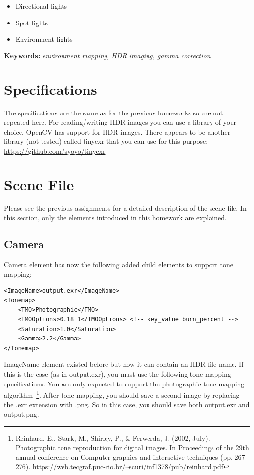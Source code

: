 \documentclass[12pt]{article}
\begin{document}
\begin{itemize}
    \item Directional lights
    \item Spot lights
    \item Environment lights
\end{itemize}

\vspace{0.5cm} \noindent \textbf{Keywords:} \emph{environment mapping, HDR imaging, gamma correction}

\section{Specifications}

The specifications are the same as for the previous
homeworks so are not repeated here. For reading/writing HDR images you
can use a library of your choice. OpenCV has support for HDR images.
There appears to be another library (not tested) called tinyexr that you
can use for this purpose: \url{https://github.com/syoyo/tinyexr}

\section{Scene File}
\label{sec:sceneFile}

\noindent Please see the previous assignments for a detailed
description of the scene file.  In this section, only the elements
introduced in this homework are explained.

\subsection{Camera}

Camera element has now the following added child elements to support
tone mapping:

\begin{verbatim}
<ImageName>output.exr</ImageName>
<Tonemap>
    <TMO>Photographic</TMO>
    <TMOOptions>0.18 1</TMOOptions> <!-- key_value burn_percent -->
    <Saturation>1.0</Saturation>
    <Gamma>2.2</Gamma>
</Tonemap>
\end{verbatim}

ImageName element existed before but now it can contain an HDR file
name. If this is the case (as in output.exr), you must use the following
tone mapping specifications. You are only expected to support the
photographic tone mapping algorithm~\footnote{Reinhard, E., Stark, M.,
Shirley, P., \& Ferwerda, J. (2002, July). Photographic tone
reproduction for digital images. In Proceedings of the 29th
annual conference on Computer graphics and interactive
techniques (pp. 267-276).
\url{https://web.tecgraf.puc-rio.br/~scuri/inf1378/pub/reinhard.pdf}}.
After tone mapping, you should save a second image by replacing the .exr
extension with .png. So in this case, you should save both output.exr
and output.png.
\end{document}
